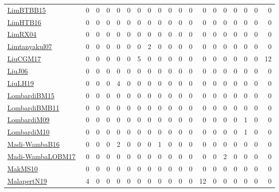 {\begin{longtable}{l*{18}{r}}
\href{papers/LimBTBB15.pdf}{LimBTBB15}~\cite{LimBTBB15} & 0 & 0 & 0 & 0 & 0 & 0 & 0 & 0 & 0 & 0 & 0 & 0 & 0 & 0 & 0 & 0 & 0 & 0\\
\href{papers/LimHTB16.pdf}{LimHTB16}~\cite{LimHTB16} & 0 & 0 & 0 & 0 & 0 & 0 & 0 & 0 & 0 & 0 & 0 & 0 & 0 & 0 & 0 & 0 & 0 & 0\\
\href{papers/LimRX04.pdf}{LimRX04}~\cite{LimRX04} & 0 & 0 & 0 & 0 & 0 & 0 & 0 & 0 & 0 & 0 & 0 & 0 & 0 & 0 & 0 & 0 & 0 & 0\\
\href{papers/Limtanyakul07.pdf}{Limtanyakul07}~\cite{Limtanyakul07} & 0 & 0 & 0 & 0 & 0 & 0 & 2 & 0 & 0 & 0 & 0 & 0 & 0 & 0 & 0 & 0 & 0 & 0\\
\href{papers/LiuCGM17.pdf}{LiuCGM17}~\cite{LiuCGM17} & 0 & 0 & 0 & 0 & 0 & 5 & 0 & 0 & 0 & 0 & 0 & 0 & 0 & 0 & 0 & 0 & 0 & 12\\
\href{papers/LiuJ06.pdf}{LiuJ06}~\cite{LiuJ06} & 0 & 0 & 0 & 0 & 0 & 0 & 0 & 0 & 0 & 0 & 0 & 0 & 0 & 0 & 0 & 0 & 0 & 0\\
\href{papers/LiuLH19.pdf}{LiuLH19}~\cite{LiuLH19} & 0 & 0 & 0 & 4 & 0 & 0 & 0 & 0 & 0 & 0 & 0 & 0 & 0 & 0 & 0 & 0 & 0 & 0\\
\href{papers/LombardiBM15.pdf}{LombardiBM15}~\cite{LombardiBM15} & 0 & 0 & 0 & 0 & 0 & 0 & 0 & 0 & 0 & 0 & 0 & 0 & 0 & 0 & 0 & 0 & 0 & 0\\
\href{papers/LombardiBMB11.pdf}{LombardiBMB11}~\cite{LombardiBMB11} & 0 & 0 & 0 & 0 & 0 & 0 & 0 & 0 & 0 & 0 & 0 & 0 & 0 & 0 & 0 & 0 & 0 & 0\\
\href{papers/LombardiM09.pdf}{LombardiM09}~\cite{LombardiM09} & 0 & 0 & 0 & 0 & 0 & 0 & 0 & 0 & 0 & 0 & 0 & 0 & 0 & 0 & 0 & 1 & 0 & 0\\
\href{papers/LombardiM10.pdf}{LombardiM10}~\cite{LombardiM10} & 0 & 0 & 0 & 0 & 0 & 0 & 0 & 0 & 0 & 0 & 0 & 0 & 0 & 0 & 0 & 1 & 0 & 0\\
\href{papers/Madi-WambaB16.pdf}{Madi-WambaB16}~\cite{Madi-WambaB16} & 0 & 0 & 0 & 2 & 0 & 0 & 0 & 1 & 0 & 0 & 0 & 0 & 0 & 0 & 0 & 0 & 0 & 0\\
\href{papers/Madi-WambaLOBM17.pdf}{Madi-WambaLOBM17}~\cite{Madi-WambaLOBM17} & 0 & 0 & 0 & 0 & 0 & 0 & 0 & 0 & 0 & 0 & 0 & 0 & 0 & 2 & 0 & 0 & 0 & 0\\
\href{papers/MakMS10.pdf}{MakMS10}~\cite{MakMS10} & 0 & 0 & 0 & 0 & 0 & 0 & 0 & 0 & 0 & 0 & 0 & 0 & 0 & 0 & 0 & 0 & 0 & 0\\
\href{papers/MalapertN19.pdf}{MalapertN19}~\cite{MalapertN19} & 4 & 0 & 0 & 0 & 0 & 0 & 0 & 0 & 0 & 0 & 0 & 12 & 0 & 0 & 0 & 0 & 0 & 0\\

\end{longtable}}
